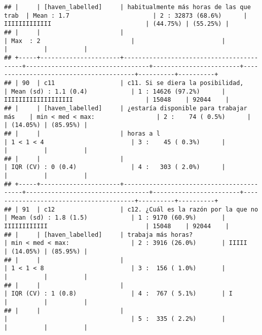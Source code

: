 \documentclass[]{article}
\begin{document}
\begin{verbatim}
## |     | [haven_labelled]     | habitualmente más horas de las que trab  | Mean : 1.7                       | 2 : 32873 (68.6%)      | IIIIIIIIIIIII                          | (44.75%) | (55.25%) |
## |     |                      |                                          | Max  : 2                         |                        |                                        |          |          |
## +-----+----------------------+------------------------------------------+----------------------------------+------------------------+----------------------------------------+----------+----------+
## | 90  | c11                  | c11. Si se diera la posibilidad,         | Mean (sd) : 1.1 (0.4)            | 1 : 14626 (97.2%)      | IIIIIIIIIIIIIIIIIII                    | 15048    | 92044    |
## |     | [haven_labelled]     | ¿estaría disponible para trabajar más    | min < med < max:                 | 2 :    74 ( 0.5%)      |                                        | (14.05%) | (85.95%) |
## |     |                      | horas a l                                | 1 < 1 < 4                        | 3 :    45 ( 0.3%)      |                                        |          |          |
## |     |                      |                                          | IQR (CV) : 0 (0.4)               | 4 :   303 ( 2.0%)      |                                        |          |          |
## +-----+----------------------+------------------------------------------+----------------------------------+------------------------+----------------------------------------+----------+----------+
## | 91  | c12                  | c12. ¿Cuál es la razón por la que no     | Mean (sd) : 1.8 (1.5)            | 1 : 9170 (60.9%)       | IIIIIIIIIIII                           | 15048    | 92044    |
## |     | [haven_labelled]     | trabaja más horas?                       | min < med < max:                 | 2 : 3916 (26.0%)       | IIIII                                  | (14.05%) | (85.95%) |
## |     |                      |                                          | 1 < 1 < 8                        | 3 :  156 ( 1.0%)       |                                        |          |          |
## |     |                      |                                          | IQR (CV) : 1 (0.8)               | 4 :  767 ( 5.1%)       | I                                      |          |          |
## |     |                      |                                          |                                  | 5 :  335 ( 2.2%)       |                                        |          |          |

\end{verbatim}
\end{document}
